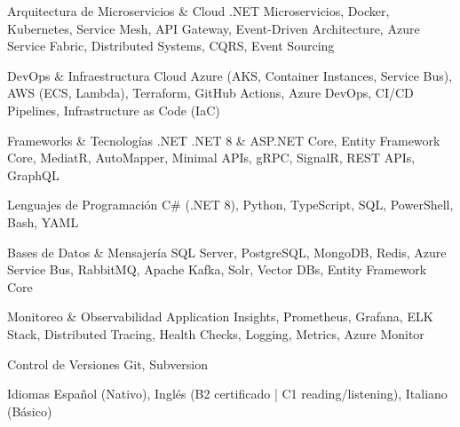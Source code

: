
\begin{cvskills}
    \cvskill
    {Arquitectura de Microservicios \& Cloud}
    {.NET Microservicios, Docker, Kubernetes, Service Mesh, API Gateway, Event-Driven Architecture, 
     Azure Service Fabric, Distributed Systems, CQRS, Event Sourcing}

    \cvskill
    {DevOps \& Infraestructura Cloud}
    {Azure (AKS, Container Instances, Service Bus), AWS (ECS, Lambda), Terraform, 
     GitHub Actions, Azure DevOps, CI/CD Pipelines, Infrastructure as Code (IaC)}

    \cvskill
    {Frameworks \& Tecnologías .NET}
    {.NET 8 \& ASP.NET Core, Entity Framework Core, MediatR, AutoMapper, 
     Minimal APIs, gRPC, SignalR, REST APIs, GraphQL}

    \cvskill
    {Lenguajes de Programación}
    {C\# (.NET 8), Python, TypeScript, SQL, PowerShell, Bash, YAML}

    \cvskill
    {Bases de Datos \& Mensajería}
    {SQL Server, PostgreSQL, MongoDB, Redis, Azure Service Bus, RabbitMQ, 
     Apache Kafka, Solr, Vector DBs, Entity Framework Core}

    \cvskill
    {Monitoreo \& Observabilidad}
    {Application Insights, Prometheus, Grafana, ELK Stack, Distributed Tracing, 
     Health Checks, Logging, Metrics, Azure Monitor}

    \cvskill
    {Control de Versiones}
    {Git, Subversion}

    \cvskill
    {Idiomas}
    {Español (Nativo), Inglés (B2 certificado | C1 reading/listening), Italiano (Básico)}
\end{cvskills}
